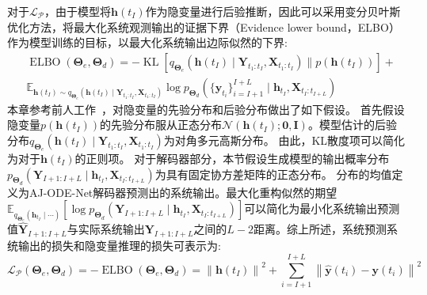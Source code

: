 对于$\mathcal{L_P}$，由于模型将$\boldsymbol h(t_I)$作为隐变量进行后验推断，因此可以采用变分贝叶斯优化方法，将最大化系统观测输出的证据下界（Evidence lower bound，ELBO）作为模型训练的目标，以最大化系统输出边际似然的下界\cite{10.5555/3454287.3454765}:
\begin{equation}
\begin{aligned}
&\operatorname{ELBO}(\boldsymbol{\Theta}_e,\boldsymbol{\Theta}_d)=-\operatorname{KL}\left[q_{\boldsymbol \Theta_e}(\boldsymbol h({t_I}) \mid\boldsymbol{Y}_{t_{1}: t_{I}}, \boldsymbol{X}_{t_{1}: t_{I}}) \| p\left(\boldsymbol h({t_I})\right)\right]+\\&\mathbb{E}_{\boldsymbol h({t_I}) \sim q_{\boldsymbol \Theta_e}(\boldsymbol h({t_I}) \mid\boldsymbol{Y}_{t_{1}: t_{I}}, \boldsymbol{X}_{t_{1}: t_{I}})}\log p_{\boldsymbol \Theta_d}(\{\boldsymbol y_{t_i}\}_{i=I+1}^{I+L}\mid \boldsymbol h_{t_I},\boldsymbol X_{t_I:t_{I+L}})
\end{aligned}
\end{equation}
本章参考前人工作~\cite{chen2018neural, 10.5555/3454287.3454765, Yildiz2019}，对隐变量的先验分布和后验分布做出了如下假设。
首先假设隐变量$p(\boldsymbol{h}(t_I))$的先验分布服从正态分布$\mathcal{N}(\boldsymbol{h}(t_I);\boldsymbol 0, \boldsymbol I)$。模型估计的后验分布$q_{\boldsymbol \Theta_e}(\boldsymbol h({t_I}) \mid\boldsymbol{Y}_{t_{1}: t_{I}}, \boldsymbol{X}_{t_{1}: t_{I}})$为对角多元高斯分布。
由此，KL散度项可以简化为对于$\boldsymbol h(t_I)$的正则项。
对于解码器部分，本节假设生成模型的输出概率分布$p_{\boldsymbol \Theta_d}({\boldsymbol Y}_{I+1: I+L}\mid \boldsymbol h_{t_I},\boldsymbol X_{t_I:t_{I+L}})$为具有固定协方差矩阵的正态分布。
分布的均值定义为AJ-ODE-Net解码器预测出的系统输出。最大化重构似然的期望$\mathbb{E}_{q_{\boldsymbol \Theta_e}(\boldsymbol h_{t_I} \mid\cdots)}\left[\log p_{\boldsymbol \Theta_d}({\boldsymbol Y}_{I+1: I+L}\mid \boldsymbol h_{t_I},\boldsymbol X_{t_I:t_{I+L}})\right]$可以简化为最小化系统输出预测值$\hat{\boldsymbol Y}_{I+1: I+L}$与实际系统输出${\boldsymbol Y}_{I+1: I+L}$之间的$L-2$距离。综上所述，系统预测系统输出的损失和隐变量推理的损失可表示为:
\begin{equation}
\mathcal{L}_{\mathcal{P}}\left(\boldsymbol{\Theta}_{e}, \boldsymbol{\Theta}_{d}\right) =-\operatorname{ELBO}\left(\boldsymbol{\Theta}_{e}, \boldsymbol{\Theta}_{d}\right)
=\left\|\boldsymbol{h}\left(t_{I}\right)\right\|^{2}+\sum_{i=I+1}^{I+L}\left\|\hat{\boldsymbol{y}}\left(t_{i}\right)-\boldsymbol{y}\left(t_{i}\right)\right\|^{2}
\end{equation}

